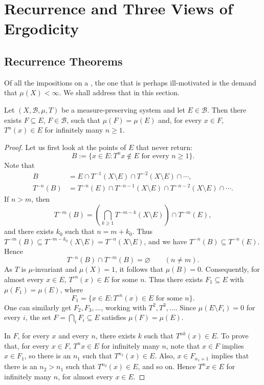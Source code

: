 \documentclass[11pt,a4paper]{article}
\begin{document}
\section*{Recurrence and Three Views of Ergodicity}
\subsection{Recurrence Theorems}
Of all the impositions on a , the one that is perhaps
ill-motivated is the demand that $\mu(X)<\infty$. We shall address that in
this section.

\setcounter{theorem}{3}\begin{theorem}
\label{thm:poincare-recurrence}
Let $(X,\mathcal B,\mu,T)$ be a measure-preserving system and let
$E\in\mathcal B$. Then there exists $F\subseteq E$, $F\in\mathcal B$, such that
$\mu(F)=\mu(E)$ and, for every $x\in F$, $T^n(x)\in E$ for infinitely many
$n\geq1$.
\end{theorem}
\begin{proof}
Let us first look at the points of $E$ that never return:
\[
  B:=\{x\in E:T^nx\notin E\text{ for every }n\geq1\}.
\]
Note that
\begin{align*}
  B&=E\cap T^{-1}(X\setminus E)\cap T^{-2}(X\setminus E)\cap\cdots,\\
  T^{-n}(B)&=T^{-n}(E)\cap T^{-n-1}(X\setminus E)
  \cap T^{-n-2}(X\setminus E)\cap\cdots.
\end{align*}
If $n>m$, then
\[
  T^{-m}(B)=\left(\bigcap_{k\geq1}T^{-m-k}(X\setminus E)\right)\cap T^{-m}(E),
\]
and there exists $k_0$
such that $n=m+k_0$. Thus
$T^{-m}(B)\subseteq T^{-m-k_0}(X\setminus E)=T^{-n}(X\setminus E)$, and we
have $T^{-n}(B)\subseteq T^{-n}(E)$. Hence
\[
  T^{-n}(B)\cap T^{-m}(B)=\varnothing\qquad(n\neq m).
\]
As $T$ is $\mu$-invariant and $\mu(X)=1$, it follows that $\mu(B)=0$.
Consequently, for almost every $x\in E$, $T^{\circ n}(x)\in E$ for some $n$.
Thus there exists $F_1\subseteq E$ with $\mu(F_1)=\mu(E)$, where
\[
  F_1=\{x\in E:T^{\circ n}(x)\in E\text{ for some }n\}.
\]
One can similarly get $F_2,F_3,\ldots$, working with $T^2,T^3,\ldots$.
Since $\mu(E\setminus F_i)=0$ for every $i$, the set $F=\bigcap_i F_i\subseteq E$
satisfies $\mu(F)=\mu(E)$.

In $F$, for every $x$ and every $n$, there exists $k$ such that $T^{nk}(x)\in E$.
To prove that, for every $x\in F$, $T^nx\in E$ for infinitely many $n$, note
that $x\in F$ implies $x\in F_1$, so there is an $n_1$ such that
$T^{n_1}(x)\in E$. Also, $x\in F_{n_1+1}$ implies that there is an
$n_2>n_1$ such that $T^{n_2}(x)\in E$, and so on. Hence $T^nx\in E$ for
infinitely many $n$, for almost every $x\in E$.
\end{proof}
\end{document}
